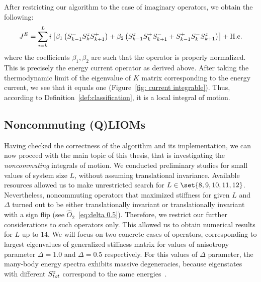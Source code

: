 After restricting our algorithm to the case of imaginary
operators, we obtain the following:
\begin{equation}
    J^E = \sum_{i=k}^L i\left[\beta_1 \left(S^{-}_{k-1}S^{z}_{k}S^{+}_{k+1}\right) + \beta_2 \left(S^{z}_{k-1}S^{+}_{k}S^{-}_{k+1}+S^{+}_{k-1}S^{-}_{k}S^{z}_{k+1}\right)\right] + \text{H.c.}
\end{equation}
where the coefficients \(\beta_1,\beta_2\) are such that the operator is properly
normalized. This is precisely the energy current operator as derived above.
After taking the thermodynamic limit of the eigenvalue of \(K\) matrix 
corresponding to the energy current, we see that it equals one (Figure~\ref{fig: current integrable}).
Thus, according to Definition~\ref{def:classification}, it is a local integral of motion. 

\subsection{Noncommuting (Q)LIOMs}
Having checked the correctness of the algorithm and its implementation, we can now proceed with the
main topic of this thesis, that is investigating the \textit{noncommuting} integrals of motion. 
We conducted preliminary studies for small values of system size \(L\), without assuming
translational invariance. Available resources allowed us to make unrestricted search for
 \(L \in \set{8,9,10,11,12}\). Nevertheless, noncommuting operators that maximized stiffness for given 
 \(L\) and \(\Delta \) turned out to be either translationally invariant or translationally invariant with
 a sign flip (see \(\hat{O}_2\)~\eqref{eq:delta 0.5}). Therefore, we restrict our further 
considerations to such operators only. This allowed us to obtain numerical
results for \(L\) up to \(14\). We will focus on two concrete cases of operators, corresponding
to largest eigenvalues of generalized stiffness matrix for values of anisotropy
parameter \(\Delta=1.0\) and \(\Delta=0.5\) respectively. For this values of
\( \Delta \) parameter, the many-body energy spectra exhibits massive degeneracies, because
eigenstates with different \(S^{z}_{tot}\) correspond to the same energies~\autocite{Fagotti2014,Mierzejewski2021}.

